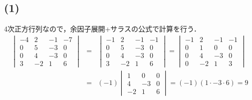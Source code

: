 \documentclass[11pt, titlepage]{jsarticle}
\begin{document}
\subsection*{(1)}
4次正方行列なので，余因子展開+サラスの公式で計算を行う．
\begin{eqnarray*}
  \begin{vmatrix}
    -4 & 2  & -1 & -7 \\
    0  & 5  & -3 & 0  \\
    0  & 4  & -3 & 0  \\
    3  & -2 & 1  & 6
  \end{vmatrix}&=&
  \begin{vmatrix}
    -1 & 2  & -1 & -1 \\
    0  & 5  & -3 & 0  \\
    0  & 4  & -3 & 0  \\
    3  & -2 & 1  & 6
  \end{vmatrix}=
  \begin{vmatrix}
    -1 & 2  & -1 & -1 \\
    0  & 1  & 0  & 0  \\
    0  & 4  & -3 & 0  \\
    0  & -2 & 1  & 3
  \end{vmatrix}\\
  &=& (-1)
  \begin{vmatrix}
    1  & 0  & 0 \\
    4  & -3 & 0 \\
    -2 & 1  & 6
  \end{vmatrix}
  = (-1)(1\cdot-3\cdot6)=9
\end{eqnarray*}

\newpage
\end{document}
